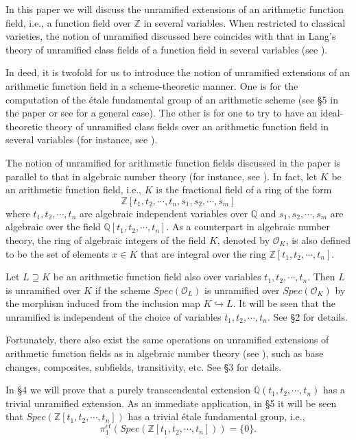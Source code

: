 \documentclass{amsart}
\theoremstyle{definition}
\numberwithin{equation}{section}
\begin{document}
In this paper we will discuss the unramified extensions of an arithmetic function field, i.e., a function field over $\mathbb{Z}$ in several variables. When restricted to classical varieties, the notion of unramified discussed here coincides with that in Lang's theory of unramified class fields of a function field in several variables (see \cite{lang}).

In deed, it is twofold for us to introduce the notion of unramified extensions of an arithmetic function field in a scheme-theoretic manner. One is for the computation of the \'{e}tale fundamental group of an arithmetic scheme (see \S 5 in the paper or see \cite{an2,an4} for a general case). The other is for one to try to have an ideal-theoretic theory of unramified class fields over an arithmetic function field in several variables (for instance, see \cite{an5}).

The notion of unramified for arithmetic function fields discussed in the paper is parallel to that in algebraic number theory (for instance, see \cite{neu}). In fact, let $K$ be an arithmetic function field, i.e., $K$ is the fractional field of a ring of the form $$
\mathbb{Z}[t_{1},t_{2},\cdots, t_{n},s_{1},s_{2},\cdots, s_{m}]
$$
where
$
t_{1},t_{2},\cdots, t_{n}
$
are algebraic independent variables over $\mathbb{Q}$ and
$
s_{1},s_{2},\cdots, s_{m}
$
are algebraic over the field $\mathbb{Q}[t_{1},t_{2},\cdots, t_{n}]$. As a counterpart in algebraic number theory, the ring of algebraic integers of the field $K$, denoted by $\mathcal{O}_{K}$, is also defined to be the set of elements $x\in K$ that are integral over the ring $\mathbb{Z}[t_{1},t_{2},\cdots, t_{n}]$.

Let $L\supseteq K$ be an arithmetic function field also over variables $t_{1},t_{2},\cdots, t_{n}$. Then $L$ is unramified over $K$ if the scheme $Spec(\mathcal{O}_{L})$ is unramified over $Spec(\mathcal{O}_{K})$ by the morphism induced from the inclusion map $K\hookrightarrow L$. It will be seen that the unramified is independent of the choice of variables $t_{1},t_{2},\cdots, t_{n}$. See \S 2 for details.

Fortunately, there also exist the same operations on unramified extensions of arithmetic function fields as  in algebraic number theory (see \cite{neu}), such as base changes, composites, subfields, transitivity, etc. See \S 3 for details.

In \S 4 we will prove that a purely transcendental extension $\mathbb{Q}(t_{1},t_{2},\cdots, t_{n})$ has a trivial unramified extension. As an immediate application, in \S 5 it will be seen that $Spec(\mathbb{Z}[t_{1},t_{2},\cdots, t_{n}])$ has a trivial \'{e}tale fundamental group, i.e., $$\pi_{1}^{et}(Spec(\mathbb{Z}[t_{1},t_{2},\cdots, t_{n}]))=\{0\}.$$
\end{document}
